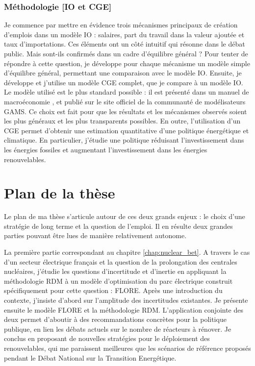 \subsubsection{Méthodologie [IO et CGE]}
Je commence par mettre en évidence trois mécanismes principaux de création d’emplois dans un modèle IO : salaires, part du travail dans la valeur ajoutée et taux d’importations. Ces éléments ont un côté intuitif qui résonne dans le débat public. Mais sont-ils confirmés dans un cadre d’équilibre général ?
Pour tenter de répondre à cette question, je développe pour chaque mécanisme un modèle simple d’équilibre général, permettant une comparaison avec le modèle IO. 
Ensuite, je développe et j’utilise un modèle CGE complet, que je compare à un modèle IO. 
Le modèle utilisé est le plus standard possible : il est présenté dans un manuel de macroéconomie \citep{Hosoe2010}, et publié sur le site officiel de la communauté de modélisateurs GAMS. Ce choix est fait pour que les résultats et les mécanismes observés soient les plus généraux et les plus transparents possibles. En outre, l'utilisation d'un CGE permet d'obtenir une estimation quantitative d’une politique énergétique et climatique. En particulier, j'étudie une politique réduisant l’investissement dans les énergies fossiles et augmentant l’investissement dans les énergies renouvelables. 



\section{Plan de la thèse}

Le plan de ma thèse s'articule autour de ces deux grands enjeux : le choix d'une stratégie de long terme et la question de l'emploi.
Il en résulte deux grandes parties pouvant être lues de manière relativement autonome.

La première partie correspondant au chapitre \ref{chap:nuclear_bet}. A travers le cas d'un secteur électrique français et la question de la prolongation des centrales nucléaires, j'étudie les questions d'incertitude et d'inertie en appliquant la méthodologie RDM à un modèle d'optimisation du parc électrique construit spécifiquement pour cette question : FLORE. 
Après une introduction du contexte, j'insiste d'abord sur l'amplitude des incertitudes existantes. Je présente ensuite le modèle FLORE et la méthodologie RDM. 
L'application conjointe des deux permet d'aboutir à des recommandations concrètes pour la politique publique, en lien les débats actuels sur le nombre de réacteurs à rénover. Je conclus en proposant de nouvelles stratégies pour le déploiement des renouvelables, qui me paraissent meilleures que les scénarios de référence proposés pendant le Débat National sur la Transition Energétique.

